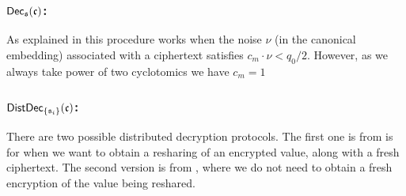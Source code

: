 \subsubsection{$\mathsf{Dec}_{\mathfrak{s}}(\mathfrak{c})$:}
As explained in \cite{SPDZ2,GHS12c} this procedure works when the noise 
$\nu$ (in the canonical embedding) associated with a ciphertext satisfies $c_m \cdot \nu  < q_{0}/2$.
However, as we always take power of two cyclotomics we have $c_m=1$

\subsubsection{$\mathsf{DistDec}_{\{\mathfrak{s}_i\}}(\mathfrak{c})$:}
There are two possible distributed decryption protocols.
The first one is from \cite{SPDZ} is for when we want to obtain a
resharing of an encrypted value, along with a fresh ciphertext.
The second version is from \cite{KPR}, where we do not need to
obtain a fresh encryption of the value being reshared.



